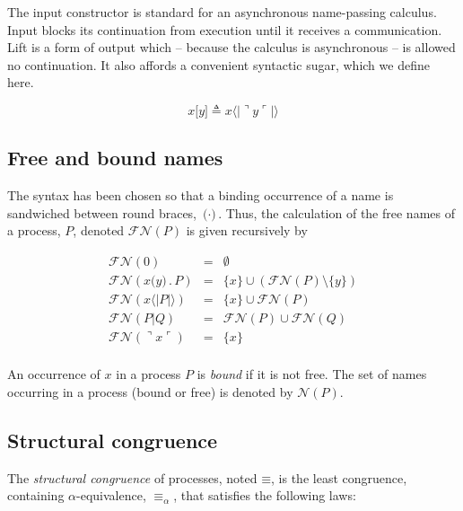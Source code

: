 \documentclass[]{amsart}
\newcommand{\lliftb}{\langle\!|}
\newcommand{\rliftb}{|\!\rangle}
\newcommand{\lpquote}{\ulcorner}
\newcommand{\rpquote}{\urcorner}
\newcommand{\id}[1]{\texttt{#1}}
\newcommand{\pzero}{\mathbin{0}}
\newcommand{\juxtap}{\mathbin{\id{|}}}
\newcommand{\concat}{\mathbin{.}}
\newcommand{\scong}{\mathbin{\equiv}}
\newcommand{\alphaeq}{\mathbin{\equiv_{\alpha}}}
\newcommand{\names}[1]{\mathbin{\mathcal{N}(#1)}}
\newcommand{\freenames}[1]{\mathbin{\mathcal{FN}(#1)}}
\newcommand{\binpar}[2]{#1 \juxtap #2}
\newcommand{\lift}[2]{#1 \lliftb #2 \rliftb}
\newcommand{\dropn}[1]{\rpquote #1 \lpquote}
\theoremstyle{definition}
\theoremstyle{remark}
\numberwithin{equation}{subsection}
\begin{document}
The input constructor is standard for an asynchronous name-passing
calculus. Input blocks its continuation from execution until it
receives a communication. Lift is a form of output which -- because
the calculus is asynchronous -- is allowed no continuation. It also
affords a convenient syntactic sugar, which we define here.

\begin{equation*}
	{x}\id{[}{y}\id{]} \triangleq \lift{x}{\dropn{y}}
\end{equation*}

\subsection{Free and bound names}

The syntax has been chosen so that a binding occurrence of a name is
sandwiched between round braces, $\id{(} \cdot \id{)}$. Thus, the
calculation of the free names of a process, $P$, denoted
$\freenames{P}$ is given recursively by

	\begin{eqnarray*}
		\freenames{\pzero} & = & \emptyset \\
		\freenames{x \id{(}y\id{)} \concat P} & = & \{ x \} \cup (\freenames{P} \setminus \{ y \}) \\
		\freenames{\lift{x}{P}} & = & \{ x \} \cup \freenames{P} \\
		\freenames{\binpar{P}{Q}} & = & \freenames{P} \cup \freenames{Q} \\
		\freenames{\dropn{x}} & = & \{ x \} \\
	\end{eqnarray*}

An occurrence of $x$ in a process $P$ is \textit{bound} if it is not
free. The set of names occurring in a process (bound or free) is
denoted by $\names{P}$.

\subsection{Structural congruence}

The {\em structural congruence} of processes, noted $\scong$, is the
least congruence, containing $\alpha$-equivalence, $\alphaeq$, that
satisfies the following laws:
\end{document}
